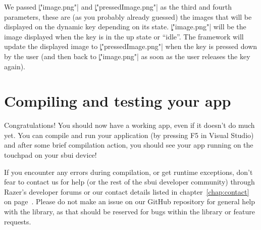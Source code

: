 We passed \c|"image.png"| and \c|"pressedImage.png"| as the third and fourth parameters, these are (as you probably already guessed) the images that will be displayed on the dynamic key depending on its state. \c|"image.png"| will be the image displayed when the key is in the up state or ``idle''. The framework will update the displayed image to \c|"pressedImage.png"| when the key is pressed down by the user (and then back to \c|"image.png"| as soon as the user releases the key again).

\section{Compiling and testing your app}
Congratulations! You should now have a working app, even if it doesn't do much yet. You can compile and run your application (by pressing F5 in Visual Studio) and after some brief compilation action, you should see your app running on the touchpad on your \gls{sbui} device!

If you encounter any errors during compilation, or get runtime exceptions, don't fear to contact us for help (or the rest of the \gls{sbui} developer community) through Razer's developer forums or our contact details listed in chapter~\ref{chap:contact} on page~\pageref{chap:contact}. Please do not make an issue on our GitHub repository for general help with the library, as that should be reserved for bugs within the library or feature requests.
